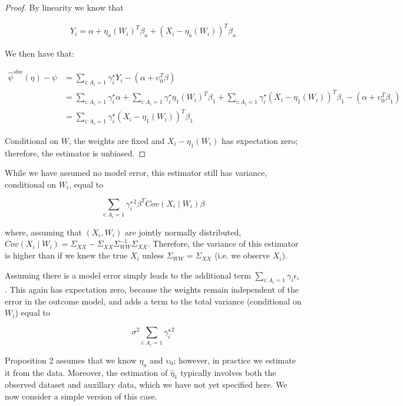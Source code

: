\begin{proof}

By linearity we know that

\begin{align*}
Y_i = \alpha + \eta_a(W_i)^T\beta_a + (X_i - \eta_a(W_i))^T\beta_a
\end{align*}

We then have that:

\begin{align*}
    \hat{\psi}^{sbw}(\eta) - \psi &= \sum_{i: A_i = 1}\gamma_i^\star Y_i - (\alpha + \upsilon_0^T\beta) \\
    &= \sum_{i: A_i = 1}\gamma_i^\star\alpha + \sum_{i: A_i = 1}\gamma_i^\star\eta_1(W_i)^T\beta_1 + \sum_{i: A_i = 1}\gamma_i^\star(X_i - \eta_1(W_i))^T\beta_1 - (\alpha + \upsilon_0^T\beta_1) \\
    &= \sum_{i: A_i = 1}\gamma_i^\star(X_i - \eta_1(W_i))^T\beta_1
\end{align*}

Conditional on $W$, the weights are fixed and $X_i - \eta_1(W_i)$ has expectation zero; therefore, the estimator is unbiased.

\end{proof}
\begin{remark}

While we have assumed no model error, this estimator still has variance, conditional on $W_i$, equal to

$$
\sum_{i: A_i = 1} \gamma_i^\star^2\beta^TCov(X_i \mid W_i)\beta
$$

where, assuming that $(X_i, W_i)$ are jointly normally distributed, $Cov(X_i \mid W_i) = \Sigma_{XX} - \Sigma_{XX}\Sigma_{WW}^{-1}\Sigma_{XX}$. Therefore, the variance of this estimator is higher than if we knew the true $X_i$ unless $\Sigma_{WW} = \Sigma_{XX}$ (i.e. we observe $X_i$). 

\end{remark}

\begin{remark}
Assuming there is a model error simply leads to the additional term $\sum_{i: A_i = 1}\gamma_i\epsilon_i$. This again has expectation zero, because the weights remain independent of the error in the outcome model, and adds a term to the total variance (conditional on $W_i$) equal to

$$
\sigma^2\sum_{i: A_i = 1}\gamma_i^\star^2
$$
\end{remark}

Proposition 2 assumes that we know $\eta_a$ and $\upsilon_0$; however, in practice we estimate it from the data. Moreover, the estimation of $\hat{\eta}_1$ typically involves both the observed dataset and auxillary data, which we have not yet specified here. We now consider a simple version of this case.

